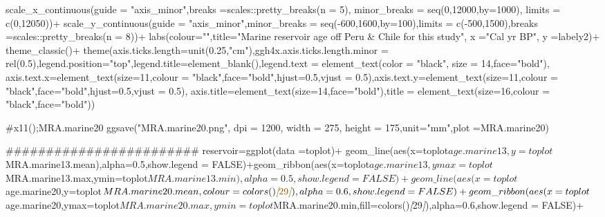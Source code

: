 \documentclass[
]{article}
\newenvironment{Shaded}{\begin{snugshade}}{\end{snugshade}}
\newcommand{\CommentTok}[1]{\textcolor[rgb]{0.56,0.35,0.01}{\textit{#1}}}
\newcommand{\NormalTok}[1]{#1}
\newcommand{\OtherTok}[1]{\textcolor[rgb]{0.56,0.35,0.01}{#1}}
\begin{document}
\begin{Shaded}
\begin{Highlighting}[]
\NormalTok{  scale\_x\_continuous(guide = "axis\_minor",breaks =scales::pretty\_breaks(n = 5),}
\NormalTok{                   minor\_breaks = seq(0,12000,by=1000),}
\NormalTok{                   limits = c(0,12050))+}
\NormalTok{  scale\_y\_continuous(guide = "axis\_minor",minor\_breaks = seq({-}600,1600,by=100),limits = c({-}500,1500),breaks =scales::pretty\_breaks(n = 8))+}
\NormalTok{  labs(colour="",title="Marine reservoir age off Peru \& Chile for this study",}
\NormalTok{       x ="Cal yr BP", }
\NormalTok{       y =labely2)+}
\NormalTok{  theme\_classic()+}
\NormalTok{  theme(axis.ticks.length=unit(0.25,"cm"),ggh4x.axis.ticks.length.minor = rel(0.5),legend.position="top",legend.title=element\_blank(),legend.text = element\_text(color = "black", size = 14,face="bold"),}
\NormalTok{        axis.text.x=element\_text(size=11,colour = "black",face="bold",hjust=0.5,vjust = 0.5),axis.text.y=element\_text(size=11,colour = "black",face="bold",hjust=0.5,vjust = 0.5),}
\NormalTok{        axis.title=element\_text(size=14,face="bold"),title = element\_text(size=16,colour = "black",face="bold"))}

\NormalTok{\#x11();MRA.marine20}
\NormalTok{ggsave("MRA.marine20.png", dpi = 1200,   width = 275,}
\NormalTok{       height = 175,unit="mm",plot =MRA.marine20)}

\NormalTok{\#\#\#\#\#\#\#\#\#\#\#\#\#\#\#\#\#\#\#\#\#\#\#\#  }
\NormalTok{reservoir=ggplot(data =toplot)+}
\NormalTok{  geom\_line(aes(x=toplot$age.marine13,y=toplot$MRA.marine13.mean),alpha=0.5,show.legend = FALSE)+geom\_ribbon(aes(x=toplot$age.marine13,ymax=toplot$MRA.marine13.max,ymin=toplot$MRA.marine13.min),alpha=0.5,show.legend = FALSE)+}
\NormalTok{  geom\_line(aes(x=toplot$age.marine20,y=toplot$MRA.marine20.mean,colour=colors()}\CommentTok{[}\OtherTok{29}\CommentTok{]}\NormalTok{),alpha=0.6,show.legend = FALSE)+geom\_ribbon(aes(x=toplot$age.marine20,ymax=toplot$MRA.marine20.max,ymin=toplot$MRA.marine20.min,fill=colors()}\CommentTok{[}\OtherTok{29}\CommentTok{]}\NormalTok{),alpha=0.6,show.legend = FALSE)+}
  

\end{Highlighting}
\end{Shaded}
\end{document}
